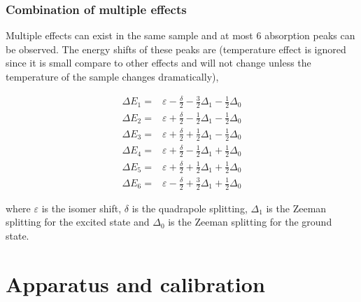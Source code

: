 \documentclass[aps,twocolumn,secnumarabic,balancelastpage,amsmath,amssymb,nofootinbib]{revtex4}
\newcommand{\eqar}[1]
{
  \begin{align*}
    #1
  \end{align*}
}
\begin{document}
\subsubsection{Combination of multiple effects}
Multiple effects can exist in the same sample and at most $6$ absorption peaks can be observed. The energy shifts of these peaks are (temperature effect is ignored since it is small compare to other effects and will not change unless the temperature of the sample changes dramatically),
\eqar{
  \Delta E_1=&\varepsilon-\frac\delta2-\frac32\Delta_1-\frac12\Delta_0\\
  \Delta E_2=&\varepsilon+\frac\delta2-\frac12\Delta_1-\frac12\Delta_0\\
  \Delta E_3=&\varepsilon+\frac\delta2+\frac12\Delta_1-\frac12\Delta_0\\
  \Delta E_4=&\varepsilon+\frac\delta2-\frac12\Delta_1+\frac12\Delta_0\\
  \Delta E_5=&\varepsilon+\frac\delta2+\frac12\Delta_1+\frac12\Delta_0\\
  \Delta E_6=&\varepsilon-\frac\delta2+\frac32\Delta_1+\frac12\Delta_0
}
where $\varepsilon$ is the isomer shift, $\delta$ is the quadrapole splitting, $\Delta_1$ is the Zeeman splitting for the excited state and $\Delta_0$ is the Zeeman splitting for the ground state.

\section{Apparatus and calibration}
\end{document}
